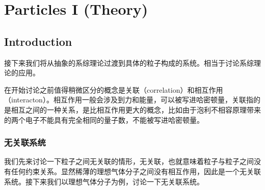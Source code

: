 \chapter{Particles I (Theory)} %
\label{cha:particles I (Theory)}
\section{Introduction} %
\label{sec:introduction}
接下来我们将从抽象的系综理论过渡到具体的粒子构成的系统。相当于讨论系综理论的应用。

在开始讨论之前值得稍微区分的概念是关联（correlation）和相互作用（interacton）。相互作用一般会涉及到力和能量，可以被写进哈密顿量，关联指的是相互之间的一种关系，是比相互作用更大的概念，比如由于泡利不相容原理带来的两个电子不能具有完全相同的量子数，不能被写进哈密顿量。

\subsection{无关联系统} %
\label{sub:无关联系统}
我们先来讨论一下粒子之间无关联的情形，无关联，也就意味着粒子与粒子之间没有任何约束关系。显然稀薄的理想气体分子之间没有相互作用，因此是一个无关联系统。接下来我们以理想气体分子为例，讨论一下无关联系统。

